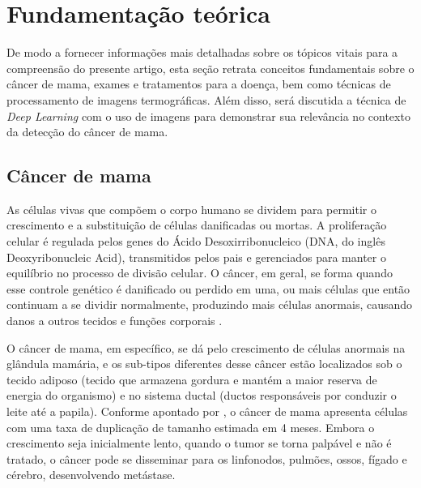 

\section{\esp Fundamentação teórica}  \label{fundteorica}

De modo a fornecer informações mais detalhadas sobre os tópicos vitais para a compreensão do presente artigo, esta seção retrata conceitos fundamentais sobre o câncer de mama, exames e tratamentos para a doença, bem como técnicas de processamento de imagens termográficas. Além disso, será discutida a técnica de \textit{Deep Learning} com o uso de imagens para demonstrar sua relevância no contexto da detecção do câncer de mama.


\subsection{\esp Câncer de mama} \label{cancerdemama}
As células vivas que compõem o corpo humano se dividem para permitir o crescimento e a substituição de células danificadas ou mortas. A proliferação celular é regulada pelos genes do Ácido Desoxirribonucleico (DNA, do inglês Deoxyribonucleic Acid), transmitidos pelos pais e gerenciados para manter o equilíbrio no processo de divisão celular. O câncer, em geral, se forma quando esse controle genético é danificado ou perdido em uma, ou mais células que então continuam a se dividir normalmente, produzindo mais células anormais, causando danos a outros tecidos e funções corporais \cite{basicOncology}.

O câncer de mama, em específico, se dá pelo crescimento de células anormais na glândula mamária, e os sub-tipos diferentes desse câncer estão localizados sob o tecido adiposo (tecido que armazena gordura e mantém a maior reserva de energia do organismo) e no sistema ductal (ductos responsáveis por conduzir o leite até a papila). Conforme apontado por , o câncer de mama apresenta células com uma taxa de duplicação de tamanho estimada em 4 meses. Embora o crescimento seja inicialmente lento, quando o tumor se torna palpável e não é tratado, o câncer pode se disseminar para os linfonodos, pulmões, ossos, fígado e cérebro, desenvolvendo metástase.

